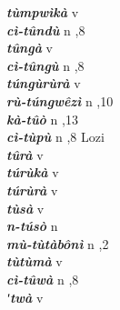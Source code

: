 \begin{multicols}{2}
{{\bfseries\itshape tùmpwìkà}} \relax  v  \relax   \relax  {} \relax   \relax  \\
{{\bfseries\itshape cì-tûndù}} \relax  n  ,8  \relax   \relax  \\
{{\bfseries\itshape tûngà}} \relax  v  \relax   \relax  {} \relax   \relax  \\
{{\bfseries\itshape cì-tûngù}} \relax  n  ,8  \relax   \relax  \\
{{\bfseries\itshape túngùrùrà}} \relax  v  \relax   \relax  {} \relax   \relax  \\
{{\bfseries\itshape rù-túngwêzì}} \relax  n  ,10  \relax   \relax  \\
{{\bfseries\itshape kà-tûò}} \relax  n  ,13  \relax   \relax  \\
{{\bfseries\itshape cì-tùpù}} \relax  n  ,8  \relax  Lozi \relax  \\
{{\bfseries\itshape tûrà}} \relax  v  \relax   \relax  {} \relax   \relax  \\
{{\bfseries\itshape túrùkà}} \relax  v  \relax   \relax  {} \relax   \relax  \\
{{\bfseries\itshape túrùrà}} \relax  v  \relax   \relax  {} \relax   \relax  \\
{{\bfseries\itshape tùsà}} \relax  v  \relax   \relax  {} \relax   \relax  \\
{{\bfseries\itshape n-túsò}} \relax  n   \relax  {} \relax   \relax  \\
{{\bfseries\itshape mù-tùtàbônì}} \relax  n  ,2  \relax   \relax  \\
{{\bfseries\itshape tùtùmà}} \relax  v  \relax   \relax  {} \relax   \relax  \\
{{\bfseries\itshape cì-tûwà}} \relax  n  ,8  \relax   \relax  \\
{{\bfseries\itshape ʹtwà}} \relax  v  \relax   \relax  {} \relax   \relax  \\

\end{multicols}
